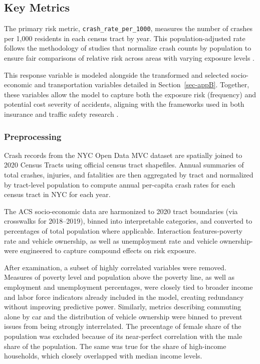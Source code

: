 \documentclass[
  number,
  review,
  3p]{elsarticle}
\begin{document}
\subsection{\texorpdfstring{\textbf{Key
Metrics}}{Key Metrics}}\label{key-metrics}

The primary risk metric, \texttt{crash\_rate\_per\_1000}, measures the
number of crashes per 1,000 residents in each census tract by year. This
population-adjusted rate follows the methodology of studies that
normalize crash counts by population to ensure fair comparisons of
relative risk across areas with varying exposure levels
\citep{brubacher, cabrera}.

This response variable is modeled alongside the transformed and selected
socio-economic and transportation variables detailed in
Section~\ref{sec-appB}. Together, these variables allow the model to
capture both the exposure risk (frequency) and potential cost severity
of accidents, aligning with the frameworks used in both insurance
\citep{clemente, henckaerts} and traffic safety research \citep{dong}.

\subsubsection{\texorpdfstring{\textbf{Preprocessing}}{Preprocessing}}\label{preprocessing}

Crash records from the NYC Open Data MVC dataset are spatially joined to
2020 Census Tracts using official census tract shapefiles. Annual
summaries of total crashes, injuries, and fatalities are then aggregated
by tract and normalized by tract-level population to compute annual
per-capita crash rates for each census tract in NYC for each year.

The ACS socio-economic data are harmonized to 2020 tract boundaries (via
crosswalks for 2018--2019), binned into interpretable categories, and
converted to percentages of total population where applicable.
Interaction features-poverty rate and vehicle ownership, as well as
unemployment rate and vehicle ownership-were engineered to capture
compound effects on risk exposure.

After examination, a subset of highly correlated variables were removed.
Measures of poverty level and population above the poverty line, as well
as employment and unemployment percentages, were closely tied to broader
income and labor force indicators already included in the model,
creating redundancy without improving predictive power. Similarly,
metrics describing commuting alone by car and the distribution of
vehicle ownership were binned to prevent issues from being strongly
interrelated. The precentage of female share of the population was
excluded because of its near-perfect correlation with the male share of
the population. The same was true for the share of high-income
households, which closely overlapped with median income levels.
\end{document}
